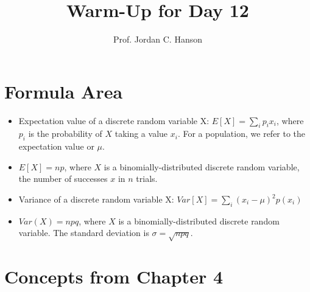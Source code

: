 \documentclass{article}
\begin{document}
\title{Warm-Up for Day 12}
\author{Prof. Jordan C. Hanson}

\maketitle

\section{Formula Area}

\begin{itemize}
\item Expectation value of a discrete random variable X: $E[X] = \sum_i p_i x_i$, where $p_i$ is the probability of $X$ taking a value $x_i$.  For a population, we refer to the expectation value or $\mu$.
\item $E[X] = n p$, where $X$ is a binomially-distributed discrete random variable, the number of successes $x$ in $n$ trials.
\item Variance of a discrete random variable X: $Var[X] = \sum_i (x_i - \mu)^2 p(x_i)$
\item $Var(X) = n p q$, where $X$ is a binomially-distributed discrete random variable.  The standard deviation is $\sigma = \sqrt{npq}$.
\end{itemize}

\section{Concepts from Chapter 4}
\end{document}
